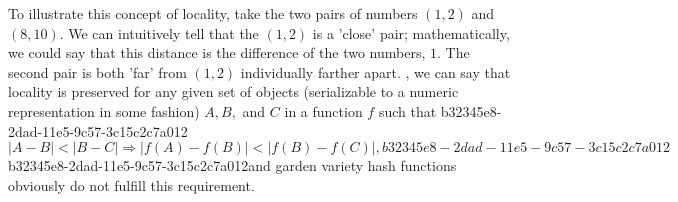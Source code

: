 \documentclass[12pt]{article}
\begin{document}
\par To illustrate this concept of locality, take the two pairs of numbers $(1,2)$ and $(8,10)$. We can intuitively tell that the $(1,2)$ is a 'close' pair; mathematically, we could say that this distance is the difference of the two numbers, $1$. The second pair is both 'far' from $(1,2)$ individually farther apart. , we can say that locality is preserved for any given set of objects (serializable to a numeric representation in some fashion) $A,B,$ and $C$ in a function $f$ such that
b32345e8-2dad-11e5-9c57-3c15c2c7a012\begin{equation}
|A-B| < |B-C| \Rightarrow |f(A)-f(B)| < |f(B) - f(C)|,
b32345e8-2dad-11e5-9c57-3c15c2c7a012\end{equation}
b32345e8-2dad-11e5-9c57-3c15c2c7a012and garden variety hash functions obviously do not fulfill this requirement.

\printbibliography
\end{document}

